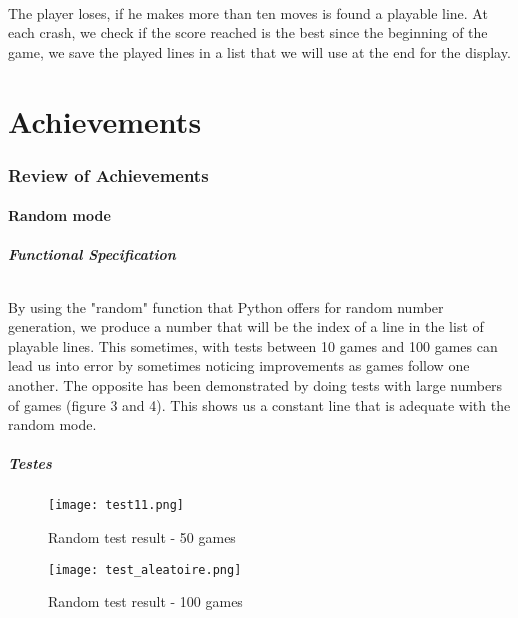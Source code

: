 \documentclass{article}
\begin{document}
\paragraph{}
\setlength{\parindent}{2cm}
 The player loses, if he makes more than ten moves is found a playable line. At each crash, we check if the score reached is the best since the beginning of the game, we save the played lines in a list that we will use at the end for the display. 

\part{Achievements}
\section{Review of Achievements}
\subsection{Random mode}
\subsubsection{Functional Specification}
\paragraph{}
\setlength{\parindent}{2cm}
By using the "random" function that Python offers for random number generation, we produce a number that will be the index of a line in the list of playable lines. This sometimes, with tests between 10 games and 100 games can lead us into error by sometimes noticing improvements as games follow one another. The opposite has been demonstrated by doing tests with large numbers of games (figure 3 and 4). This shows us a constant line that is adequate with the random mode.
\subsubsection{Testes}
\begin{figure}[!h]
\centering
\texttt{[image: test11.png]}
\\%
\caption{Random test result - 50 games}
\end{figure}

\begin{figure}[!h]
\centering
\texttt{[image: test\_aleatoire.png]}
\\%
\caption{Random test result - 100 games}
\end{figure}
\end{document}
